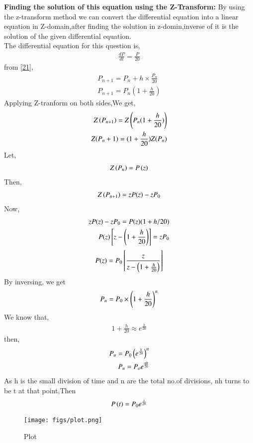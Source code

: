\documentclass[journal]{IEEEtran}
\begin{document}
\textbf{Finding the solution of this equation using the Z-Transform:} By using the z-transform method we can convert the differential equation into a linear equation in Z-domain,after finding the solution in z-domin,inverse of it is the solution of the given differential equation. \\
The differential equation for this question is,
\begin{align}
\frac{dP}{dt}=\frac{P}{20}
\end{align}
from \eqref{21}, \\
\begin{align}
P_{n+1}=P_{n}+h \times \frac{P_n}{20} \\
P_{n+1}=P_{n}(1+\frac{h}{20})
\end{align}
Applying Z-tranform on both sides,We get,
\begin{align}
Z\left(P_{n+1}\right)=Z\left(P_{n}(1+\frac{h}{20})\right) \\
Z(P_n+1)=(1+\frac{h}{20})Z(P_n)
\end{align}
Let,
\begin{align}
Z\left(P_n\right)=P\left(z\right)
\end{align}
Then,
\begin{align}
Z\left(P_{n+1}\right)=zP(z)-zP_0
\end{align}
Now,
\begin{align}
zP(z)-zP_0 = P(z)(1+h/20) \\
P(z) {}\left[z-\left(1+\frac{h}{20}\right)\right] = zP_0 \\
\end{align}
\begin{align}
P(z) = P_0 {}\left[\frac{z}{z-\left(1+\frac{h}{20}\right)}\right]
\end{align}
By inversing, we get 
\begin{align}
P_n = P_0 \times \left(1+\frac{h}{20}\right)^n
\end{align}
We know that,
\begin{align}
1+\frac{h}{20} \approx e^{\frac{h}{20}}
\end{align}
then,
\begin{align}
P_n = P_0 \left(e^{\frac{h}{20}}\right)^n \\
P_n = P_o e^{\frac{nh}{20}}
\end{align}
As h is the small division of time and n are the total no.of divisions, nh turns to be t at that point,Then
\begin{align}
P\left(t\right)=P_0e^{\frac{t}{20}}
\end{align}



\begin{figure}[htbp] %
    \centering
    \texttt{[image: figs/plot.png]} %
    \caption{Plot}
\end{figure}
\end{document}
